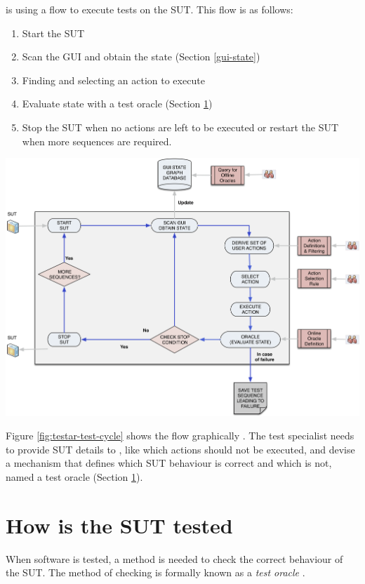\testar is using a flow to execute tests on the SUT. This flow is as follows:
\begin{samepage}
\begin{enumerate}
    \item Start the SUT
    \item Scan the GUI and obtain the state (Section \ref{gui-state})
    \item Finding and selecting an action to execute
    \item Evaluate state with a test oracle (Section \ref{test-oracles})
    \item Stop the SUT when no actions are left to be executed or restart the SUT when more sequences are required.
\end{enumerate}
\end{samepage}

\bigskip
\begingroup
\captionsetup{type=figure}
\includegraphics[scale=0.36]{images/testar-test-cycle.png}
\label{fig:testar-test-cycle}
\endgroup

Figure \ref{fig:testar-test-cycle} shows the flow graphically \cite{VosAho2021}. The test specialist needs to provide SUT details to \testar, like which actions should not be executed, and devise a mechanism that defines which SUT behaviour is correct and which is not, named a test oracle (Section \ref{test-oracles}). 

\section{How is the SUT tested} \label{test-oracles}
When software is tested, a method is needed to check the correct behaviour of the SUT. The method of checking is formally known as a \emph{test oracle} \cite{testOracles}. 


